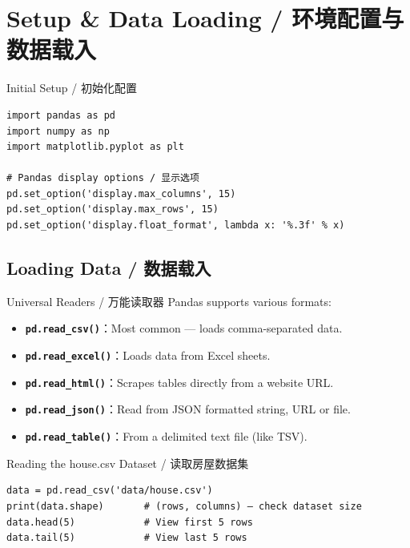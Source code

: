 \documentclass[11pt,a4paper]{report}
\let\oldtexttt\texttt
\renewcommand{\texttt}[1]{\textcolor{mainblue}{\oldtexttt{#1}}}
\begin{document}
\section{Setup \& Data Loading / 环境配置与数据载入}

\begin{examplebox}{Initial Setup / 初始化配置}
\begin{lstlisting}
import pandas as pd
import numpy as np
import matplotlib.pyplot as plt

# Pandas display options / 显示选项
pd.set_option('display.max_columns', 15)
pd.set_option('display.max_rows', 15)
pd.set_option('display.float_format', lambda x: '%.3f' % x)
\end{lstlisting}
\end{examplebox}

\subsection{Loading Data / 数据载入}

\begin{concept}{Universal Readers / 万能读取器}
    Pandas supports various formats:
    \begin{itemize}[itemsep=0.3em]
        \item \textbf{\texttt{pd.read\_csv()}}：Most common — loads comma-separated data.
        \item \textbf{\texttt{pd.read\_excel()}}：Loads data from Excel sheets.
        \item \textbf{\texttt{pd.read\_html()}}：Scrapes tables directly from a website URL.
        \item \textbf{\texttt{pd.read\_json()}}：Read from JSON formatted string, URL or file.
        \item \textbf{\texttt{pd.read\_table()}}：From a delimited text file (like TSV).
    \end{itemize}
\end{concept}

\begin{examplebox}{Reading the house.csv Dataset / 读取房屋数据集}
\begin{lstlisting}
data = pd.read_csv('data/house.csv')
print(data.shape)       # (rows, columns) — check dataset size
data.head(5)            # View first 5 rows
data.tail(5)            # View last 5 rows
\end{lstlisting}
\end{examplebox}
\end{document}
